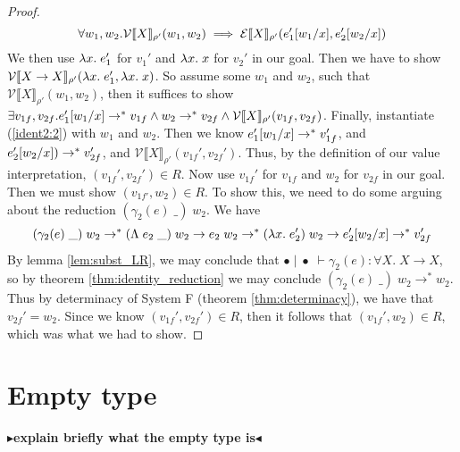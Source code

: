 \documentclass[twoside,11pt,openright]{report}
\theoremstyle{definition}
\newcommand{\var}{x}
\newcommand{\expr}{e}
\newcommand{\val}{v}
\newcommand{\valB}{w}
\newcommand{\Tvar}{X}
\newcommand{\Tlam}{\Lambda\;}
\newcommand{\Tapp}[1]{#1\;\_}
\newcommand{\subst}[3]{#1{\left[#3 \middle/ #2 \right]}}
\newcommand{\Tfunc}[2]{#1 \rightarrow #2}
\newcommand{\Tall}[2]{\forall #1.\; #2}
\newcommand{\emptenv}{\bullet}
\newcommand{\empvenv}{\bullet}
\newcommand{\jdg}[4]{#1 \; | \; #2 \; \vdash #3 : #4}
\newcommand{\step}{\rightarrow}
\newcommand{\stepS}{\rightarrow^*}
\newcommand{\ValInp}[2]{\mathcal{V} \llbracket #1 \rrbracket_{#2}}
\newcommand{\ExpInp}[2]{\mathcal{E} \llbracket #1 \rrbracket_{#2}}
\newcommand{\todo}[1]{{\color[rgb]{.5,0,0}\textbf{$\blacktriangleright$#1$\blacktriangleleft$}}}
\begin{document}
\begin{proof}
\begin{equation}
    \forall \valB_1, \valB_2 . \ValInp{\Tvar}{\rho'}(\valB_{1}, \valB_{2}) \implies \ExpInp{\Tvar}{\rho'}(\subst{\expr_1'}{\var}{\valB_1}, \subst{\expr_2'}{\var}{\valB_2})
  \end{equation}
  We then use $\fun \var . \expr_1'$ for $\val_1'$ and $\fun \var . \var$ for $\val_2'$ in our goal. Then we have to show $\ValInp{\Tfunc{\Tvar}{\Tvar}}{\rho'}(\fun \var . \expr_1', \fun \var . \var)$. So assume some $\valB_1$ and $\valB_2$, such that $\ValInp{\Tvar}{\rho'}(\valB_1, \valB_2)$, then it suffices to show $\exists \val_{1f}, \val_{2f} . \subst{\expr_1'}{\var}{\valB_1} \stepS \val_{1f} \land \valB_2 \stepS \val_{2f} \land \ValInp{\Tvar}{\rho'}(\val_{1f}, \val_{2f})$. Finally, instantiate (\ref*{ident2:2}) with $\valB_1$ and $\valB_2$. Then we know $\subst{\expr_1'}{\var}{\valB_1} \stepS \val_{1f}'$, and $\subst{\expr_2'}{\var}{\valB_2}) \stepS \val_{2f}'$, and $\ValInp{\Tvar}{\rho'}(\val_{1f}', \val_{2f}')$.
  Thus, by the definition of our value interpretation, $(\val_{1f}', \val_{2f}') \in R$. Now use $\val_{1f}'$ for $\val_{1f}$ and $\valB_2$ for $\val_{2f}$ in our goal. Then we must show $(\val_{1f'}, \valB_2) \in R$. To show this, we need to do some arguing about the reduction $(\Tapp{\gamma_2(\expr)}) \; \valB_2$. We have 
  \begin{equation*}
    (\Tapp{\gamma_2(\expr)}) \; \valB_2 \stepS (\Tapp{\Tlam \expr_2}) \; \valB_2 \step \expr_2 \; \valB_2 \stepS (\fun \var . \expr_2') \; \valB_2 \step \subst{\expr_2'}{\var}{\valB_2} \stepS \val_{2f}'
  \end{equation*}
  By lemma \ref{lem:subst_LR}, we may conclude that $\jdg{\emptenv}{\empvenv}{\gamma_2(\expr)}{\Tall{\Tvar}{\Tfunc{\Tvar}{\Tvar}}}$, so by theorem \ref{thm:identity_reduction} we may conclude $(\Tapp{\gamma_2(\expr)}) \; \valB_2 \stepS \valB_2$. Thus by determinacy of System F (theorem \ref{thm:determinacy}), we have that $\val_{2f}' = \valB_2$. Since we know $(\val_{1f}', \val_{2f}') \in R$, then it follows that $(\val_{1f}', \valB_2) \in R$, which was what we had to show.
\end{proof}


\section{Empty type}

\todo{explain briefly what the empty type is}
\end{document}

